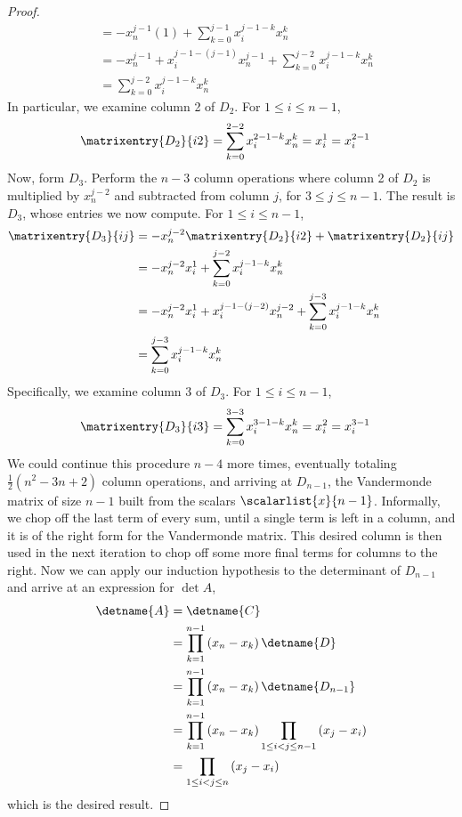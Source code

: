 \begin{proof}
\begin{align*}
&=-x_n^{j-1}(1)+\sum_{k=0}^{j-1} x_{i}^{j-1-k}x_{n}^{k}\\
&=-x_n^{j-1}+x_{i}^{j-1-(j-1)}x_{n}^{j-1}
  +\sum_{k=0}^{j-2} x_{i}^{j-1-k}x_{n}^{k}\\
&=\sum_{k=0}^{j-2} x_{i}^{j-1-k}x_{n}^{k}
\end{align*}
%
In particular, we examine column 2 of $D_2$.  For $1\leq i\leq n-1$,
%
\begin{align*}
\matrixentry{D_2}{i2}
&=\sum_{k=0}^{2-2} x_{i}^{2-1-k}x_{n}^{k}
=x_{i}^{1}
=x_{i}^{2-1}
\end{align*}
%
Now, form $D_3$.  Perform the $n-3$ column operations where column 2 of $D_2$ is multiplied by $x_n^{j-2}$ and subtracted from column $j$, for $3\leq j\leq n-1$.  The result is $D_3$, whose entries we now compute.  For $1\leq i\leq n-1$,
%
\begin{align*}
\matrixentry{D_3}{ij}
&=-x_n^{j-2}\matrixentry{D_2}{i2}+\matrixentry{D_2}{ij}\\
&=-x_n^{j-2}x_{i}^{1}+\sum_{k=0}^{j-2} x_{i}^{j-1-k}x_{n}^{k}\\
&=-x_n^{j-2}x_{i}^{1}+ x_{i}^{j-1-(j-2)}x_{n}^{j-2}
  +\sum_{k=0}^{j-3} x_{i}^{j-1-k}x_{n}^{k}\\
&=\sum_{k=0}^{j-3} x_{i}^{j-1-k}x_{n}^{k}
\end{align*}
%
Specifically, we examine column 3 of $D_3$.  For $1\leq i\leq n-1$,
%
\begin{align*}
\matrixentry{D_3}{i3}
&=\sum_{k=0}^{3-3} x_{i}^{3-1-k}x_{n}^{k}
=x_{i}^{2}
=x_{i}^{3-1}
\end{align*}
%
We could continue this procedure $n-4$ more times, eventually totaling $\frac{1}{2}\left(n^2-3n+2\right)$ column operations, and arriving at $D_{n-1}$, the Vandermonde matrix of size $n-1$ built from the scalars $\scalarlist{x}{n-1}$.  Informally, we chop off the last term of every sum, until a single term is left in a column, and it is of the right form for the Vandermonde matrix.  This desired column is then used in the next iteration to chop off some more final terms for columns to the right.  Now we can apply our induction hypothesis to the determinant of $D_{n-1}$ and arrive at an expression for $\det{A}$,
%
\begin{align*}
\detname{A}
&=\detname{C}\\
&=\prod_{k=1}^{n-1}\left(x_n-x_k\right)\detname{D}\\
&=\prod_{k=1}^{n-1}\left(x_n-x_k\right)\detname{D_{n-1}}\\
&=\prod_{k=1}^{n-1}\left(x_n-x_k\right)\prod_{1\leq i<j\leq n-1}\left(x_j-x_i\right)\\
&=\prod_{1\leq i<j\leq n}\left(x_j-x_i\right)
\end{align*}
%
which is the desired result.
\end{proof}

